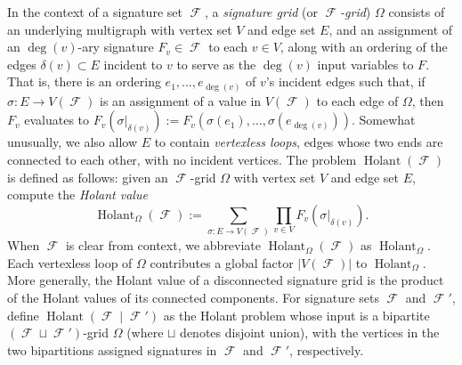 \documentclass{theoretics}
\DeclareMathOperator{\fc}{\mathcal{F}}
\DeclareMathOperator{\holant}{Holant}
\begin{document}
In the context of a signature set $\fc$, a
\emph{signature grid} (or \emph{$\fc$-grid}) $\Omega$ consists of an underlying multigraph with 
vertex set $V$ and edge set $E$, and an assignment of an $\deg(v)$-ary signature $F_v \in \fc$ 
to each $v \in V$, along with an ordering of the edges $\delta(v) \subset E$ incident to $v$ 
to serve as the
$\deg(v)$ input variables to $F$. That is, there is an ordering $e_1,\ldots,e_{\deg(v)}$ of $v$'s 
incident edges such that, if $\sigma: E \to V(\fc)$ is an assignment of a value in $V(\fc)$ to each
edge of $\Omega$, then $F_v$ evaluates to 
$F_v(\sigma|_{\delta(v)}) := F_v(\sigma(e_1),\ldots,\sigma(e_{\deg(v)}))$.
Somewhat unusually, we also allow $E$ to contain \emph{vertexless loops}, edges whose two ends are 
connected to each other, with no incident vertices.
The problem $\holant(\fc)$ is defined as follows: given an $\fc$-grid $\Omega$
with vertex set $V$ and edge set $E$, compute the \emph{Holant value}
\begin{equation}
    \holant_\Omega(\fc) := \sum_{\sigma: E \to V(\fc)} \prod_{v \in V} F_v(\sigma|_{\delta(v)}).
    \label{eq:holant}
\end{equation}
When $\fc$ is clear from context, we abbreviate $\holant_\Omega(\fc)$ as 
$\holant_\Omega$. Each vertexless loop of $\Omega$ contributes a global factor $|V(\fc)|$ to
$\holant_\Omega$. More generally, the Holant value of a disconnected signature grid
is the product of the Holant values of its connected components.
For signature sets $\fc$ and $\fc'$, define $\holant(\fc \mid \fc')$ as the Holant problem 
whose input is a bipartite $(\fc\sqcup\fc')$-grid
$\Omega$ (where $\sqcup$ denotes disjoint union), with the vertices in the two bipartitions 
assigned signatures in $\fc$ and $\fc'$, respectively.
\end{document}
